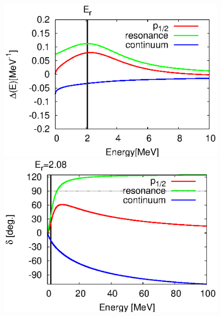 \documentclass[english,a4paper]{jsarticle}
\begin{document}
\begin{figure}
  \begin{minipage}{0.5\textwidth}
    \begin{flushright}
      \includegraphics[width=1.0\textwidth,clip]{../cld/allcld/allcld_p1_100MeV.eps}
    \end{flushright}
  \end{minipage}
  \begin{minipage}{0.5\textwidth}
    \begin{flushright}
      \includegraphics[width=1.0\textwidth,clip]{../phs/allphs/allphs_p1_100MeV.eps}
    \end{flushright}
  \end{minipage}
\end{figure}
\end{document}

